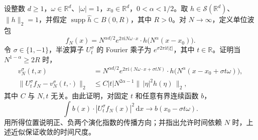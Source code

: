 \begin{optionalexercise}\label{b2:ex:21-new-8}
设整数 \(d\geq1\)，\(\omega\in\mathbb R^d\)、\(|\omega|=1\)，\(x_0\in\mathbb R^d\)，\(0<\alpha<1/2\)。取 \(h\in\mathcal S(\mathbb R^d)\)、\(\|h\|_2=1\)，并假定 \(\operatorname{supp}\widehat h\subset B(0,R)\)，其中 \(R>0\)。对 \(N\to\infty\)，定义单位波包
\[
 f_N(x)=N^{\alpha d/2}e^{2\pi\mathrm iN\omega\cdot x}
                       \cdot h\bigl(N^\alpha(x-x_0)\bigr).
\]
令 \(\sigma\in\{1,-1\}\)，半波算子 \(U_t^\sigma\) 的 Fourier 乘子为
\(e^{\sigma2\pi\mathrm it|\xi|}\)，其中 \(t\in\mathbb R\)。证明当 \(N^{1-\alpha}\geq2R\) 时，
\[
 \begin{aligned}
 v_N^\sigma(t,x)
 &=N^{\alpha d/2}e^{2\pi\mathrm i(N\omega\cdot x+\sigma tN)}
                    \cdot h\bigl(N^\alpha(x-x_0+\sigma t\omega)\bigr),\\
 \|U_t^\sigma f_N-v_N^\sigma(t,\cdot)\|_2
 &\leq C|t|N^{2\alpha-1}
                \bigl\|\,|\eta|^2\widehat h(\eta)\,\bigr\|_2,
 \end{aligned}
\]
其中 \(C\) 与 \(N,t\) 无关。由此证明，对固定 \(t\) 和任意有界连续函数 \(b\)，
\[
 \int b(x)\cdot|U_t^\sigma f_N(x)|^2\,\mathrm dx
       \longrightarrow b(x_0-\sigma t\omega).
\]
用所得位置说明正、负两个演化指数的传播方向；并指出允许时间依赖 \(N\) 时，上述近似保证收敛的时间尺度。
\end{optionalexercise}
